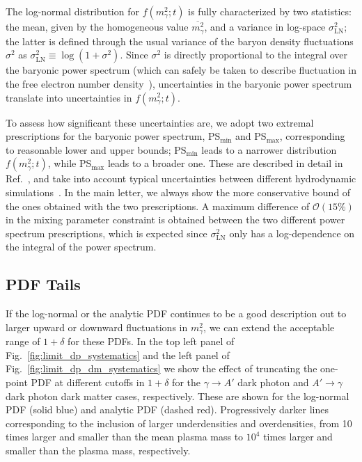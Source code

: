 \documentclass[prd,aps,10pt,nofootinbib,twocolumn,superscriptaddress,preprintnumbers,balancelastpage,longbibliography]{revtex4-1}
\begin{document}
The log-normal distribution for $f(m_\gamma^2;t)$ is fully characterized by two statistics: the mean, given by the homogeneous value $\overline{m_\gamma^2}$, and a variance in log-space $\sigma_\text{LN}^2$; the latter is defined through the usual variance of the baryon density fluctuations $\sigma^2$ as $\sigma_\text{LN}^2 \equiv \log(1 + \sigma^2)$. Since $\sigma^2$ is directly proportional to the integral over the baryonic power spectrum (which can safely be taken to describe fluctuation in the free electron number density~\cite{OurLongPaper}), uncertainties in the baryonic power spectrum translate  into uncertainties in $f(m_\gamma^2;t)$.

To assess how significant these uncertainties are, we adopt two extremal prescriptions for the baryonic power spectrum, PS$_{\min}$ and PS$_{\max}$, corresponding to reasonable lower and upper bounds; PS$_{\min}$ leads to a narrower distribution $f(m_\gamma^2;t)$, while PS$_{\max}$ leads to a broader one. These are described in detail in Ref.~\cite{OurLongPaper}, and take into account typical uncertainties between different hydrodynamic simulations~\cite{Nelson:2018uso,McAlpine:2015tma,McCarthy:2016mry,Genel:2014lma}. In the main letter, we always show the more conservative bound of the ones obtained with the two prescriptions. A maximum difference of $\mathcal O (15\%)$ in the mixing parameter constraint is obtained between the two different power spectrum prescriptions, which is expected since $\sigma_\text{LN}^2$ only has a log-dependence on the integral of the power spectrum.

\subsection{PDF Tails}

If the log-normal or the analytic PDF continues to be a good description out to larger upward or downward fluctuations in $m_\gamma^2$, we can extend the acceptable range of $1+\delta$ for these PDFs. In the top left panel of Fig.~\ref{fig:limit_dp_systematics} and the left panel of Fig.~\ref{fig:limit_dp_dm_systematics} we show the effect of truncating the one-point PDF at different cutoffs in $1 + \delta$ for the $\gamma\to A'$ dark photon and $A' \to \gamma$ dark photon dark matter cases, respectively. These are shown for the log-normal PDF (solid blue) and analytic PDF (dashed red). Progressively darker lines corresponding to the inclusion of larger underdensities and overdensities, from 10 times larger and smaller than the mean plasma mass to $10^4$ times larger and smaller than the plasma mass, respectively.
\end{document}
